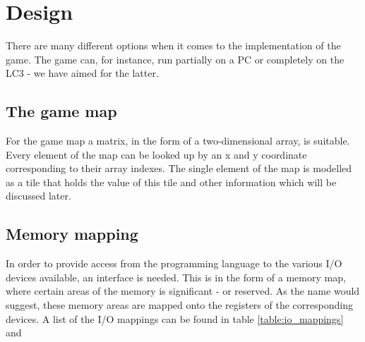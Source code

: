 \documentclass{acm_proc_article-sp}
\begin{document}

\section{Design}
There are many different options when it comes to the implementation of the game. The game can, for instance, run partially on a PC or completely on the LC3 - we have aimed for the latter.
\subsection{The game map}
For the game map a matrix, in the form of a two-dimensional array, is suitable. Every element of the map can be looked up by an x and y coordinate corresponding to their array indexes. The single element of the map is modelled as a tile that holds the value of this tile and other information which will be discussed later.

\subsection{Memory mapping}
In order to provide access from the programming language to the various I/O devices available, an interface is needed. This is in the form of a memory map, where certain areas of the memory is significant - or reserved. As the name would suggest, these memory areas are mapped onto the registers of the corresponding devices. A list of the I/O mappings can be found in table \ref{table:io_mappings} and \cite{patt2000introduction}
\end{document}
